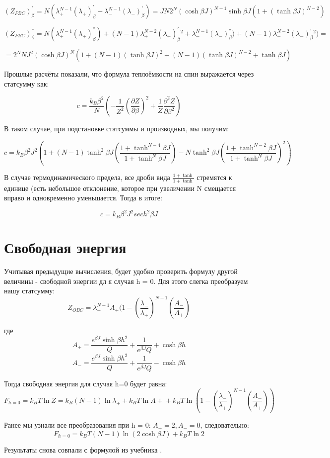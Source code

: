 \documentclass{article}
\newcommand{\bj}{\beta J}
\newcommand{\bh}{\beta h}
\newcommand{\lp}{\lambda_{+}}
\newcommand{\lm}{\lambda_{-}}
\newcommand{\pbc}{_{PBC}}
\newcommand{\obc}{_{OBC}}
\newcommand{\dzdb}{\frac{\partial Z}{\partial \beta}}
\newcommand{\prpb}{^{'}_{\beta}}
\newcommand{\vprpb}{^{''}_{\beta}}
\numberwithin{equation}{section}
\begin{document}
 \[ (Z\pbc)\prpb = N(\lp^{N-1} (\lp)\prpb + \lm^{N-1} (\lm)\prpb) = J N 2^{N} (\cosh{\bj})^{N-1} \sinh{\bj} (1 + (\tanh{\bj})^{N-2}) \]
 
 \[ (Z\pbc)\vprpb = N (\lp^{N-1} (\lp)\vprpb) + (N-1)\lp^{N-2} (\lp)\prpb^{2} + \lm^{N-1} (\lm)\vprpb) + (N-1)\lm^{N-2} (\lm)\prpb^{2}) = \]
 
 \[ = 2^{N} N J^{2} (\cosh{\bj})^{N} (1 + (N-1)(\tanh{\bj})^{2} + (N-1)(\tanh{\bj})^{N-2} + \tanh{\bj})\]
 
Прошлые расчёты показали, что формула теплоёмкости на спин выражается через статсумму как:

\[ c = \frac{k_{B} \beta^{2}}{N} (- \frac{1}{Z^{2}} (\dzdb)^{2} + \frac{1}{Z} \frac{\partial^{2} Z}{\partial \beta^{2}}) \]

В таком случае, при подстановке статсуммы и производных, мы получим:

\[ c = k_{B} \beta^{2} J^{2} \left(1 + (N-1) \tanh^{2}\bj (\frac{1 + \tanh^{N-4}\bj}{1 + \tanh^{N}\bj}) - N \tanh^{2}\bj (\frac{1 + \tanh^{N-2}\bj}{1 + \tanh^{N}\bj})^{2}\right) \]

В случае термодинамического предела, все дроби вида $ \frac{1 + \tanh}{1 + \tanh}$ стремятся к единице (есть небольшое отклонение, которое при увеличении N смещается вправо и одновременно уменьшается. Тогда в итоге:

\[ c = k_{B} \beta^{2} J^{2} sech^{2} \bj \]

\section{Свободная энергия}
Учитывая предыдущие вычисления, будет удобно проверить формулу другой величины - свободной энергии дл 
я случая h = 0. Для этого слегка преобразуем нашу статсумму:
\[ Z\obc = \lp^{N-1}A_{+}(1 - (\frac{\lm}{\lp})^{N-1}(\frac{A_{-}}{A_{+}}) \]

где \[ A_{+} = \frac{e^{\bj} \sinh{\bh}^2}{Q} + \frac{1}{e^{\bj}Q} +  \cosh{\bh}\]
\[ A_{-} = \frac{e^{\bj} \sinh{\bh}^2}{Q} + \frac{1}{e^{\bj}Q} -  \cosh{\bh}\]

Тогда свободная энергия для случая h=0 будет равна:
\[ F_{h=0} = k_{B}T\ln{Z} =  k_{B}(N-1)\ln{\lp} + k_{B}T\ln{A+} + k_{B}T\ln{(1 - (\frac{\lm}{\lp})^{N-1}(\frac{A_{-}}{A_{+}}))}\]

Ранее мы узнали все преобразования при h = 0: $A_{+} = 2, A_{-} = 0$, следовательно:
\[ F_{h=0} = k_{B}T(N-1)\ln{(2\cosh{\bj})} + k_{B}T\ln{2}\]

Результаты снова совпали с формулой из учебника \cite{Swen}.
\end{document}
